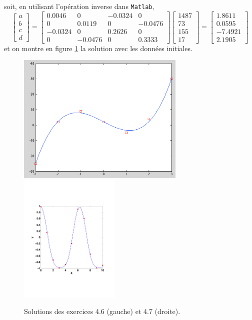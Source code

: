 soit, en utilisant l'opération inverse dans \texttt{Matlab},
\begin{equation*}
\begin{bmatrix} a \\ b \\ c \\ d\end{bmatrix}=
\begin{bmatrix}
    0.0046    &     0  & -0.0324    &     0 \\
         0    & 0.0119 &        0 &  -0.0476 \\
   -0.0324    &     0  &  0.2626  &      0 \\
         0    & -0.0476 &        0 &   0.3333
\end{bmatrix}
\begin{bmatrix}
1487\\
73\\
155\\
17
\end{bmatrix}=
\begin{bmatrix}
    1.8611 \\
    0.0595 \\
   -7.4921 \\
    2.1905
    \end{bmatrix}
\end{equation*}
et on montre en figure \ref{fig:exe7} la solution avec les données initiales.
\begin{figure}[t]
   \centering
   \includegraphics[height=62mm]{assets/figures/exe7fig1serie2.pdf} \hspace{5mm}
   \includegraphics[height=62mm]{assets/figures/exe8fig1serie2.pdf}
   \caption{Solutions des exercices 4.6 (gauche) et 4.7 (droite).}
   \label{fig:exe7}
\end{figure}

